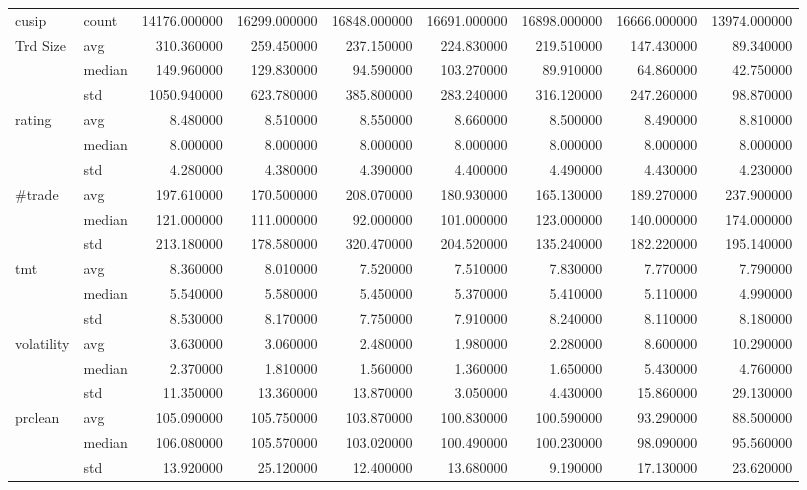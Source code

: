 \documentclass{article}
\begin{document}
\begin{landscape}
\begin{table}[ht]
\begin{tabular}{llrrrrrrr}
\cline{1-9}
cusip & count & 14176.000000 & 16299.000000 & 16848.000000 & 16691.000000 & 16898.000000 & 16666.000000 & 13974.000000 \\
\cline{1-9}
\multirow[t]{3}{*}{Trd Size} & avg & 310.360000 & 259.450000 & 237.150000 & 224.830000 & 219.510000 & 147.430000 & 89.340000 \\
 & median & 149.960000 & 129.830000 & 94.590000 & 103.270000 & 89.910000 & 64.860000 & 42.750000 \\
 & std & 1050.940000 & 623.780000 & 385.800000 & 283.240000 & 316.120000 & 247.260000 & 98.870000 \\
\cline{1-9}
\multirow[t]{3}{*}{rating} & avg & 8.480000 & 8.510000 & 8.550000 & 8.660000 & 8.500000 & 8.490000 & 8.810000 \\
 & median & 8.000000 & 8.000000 & 8.000000 & 8.000000 & 8.000000 & 8.000000 & 8.000000 \\
 & std & 4.280000 & 4.380000 & 4.390000 & 4.400000 & 4.490000 & 4.430000 & 4.230000 \\
\cline{1-9}
\multirow[t]{3}{*}{#trade} & avg & 197.610000 & 170.500000 & 208.070000 & 180.930000 & 165.130000 & 189.270000 & 237.900000 \\
 & median & 121.000000 & 111.000000 & 92.000000 & 101.000000 & 123.000000 & 140.000000 & 174.000000 \\
 & std & 213.180000 & 178.580000 & 320.470000 & 204.520000 & 135.240000 & 182.220000 & 195.140000 \\
\cline{1-9}
\multirow[t]{3}{*}{tmt} & avg & 8.360000 & 8.010000 & 7.520000 & 7.510000 & 7.830000 & 7.770000 & 7.790000 \\
 & median & 5.540000 & 5.580000 & 5.450000 & 5.370000 & 5.410000 & 5.110000 & 4.990000 \\
 & std & 8.530000 & 8.170000 & 7.750000 & 7.910000 & 8.240000 & 8.110000 & 8.180000 \\
\cline{1-9}
\multirow[t]{3}{*}{volatility} & avg & 3.630000 & 3.060000 & 2.480000 & 1.980000 & 2.280000 & 8.600000 & 10.290000 \\
 & median & 2.370000 & 1.810000 & 1.560000 & 1.360000 & 1.650000 & 5.430000 & 4.760000 \\
 & std & 11.350000 & 13.360000 & 13.870000 & 3.050000 & 4.430000 & 15.860000 & 29.130000 \\
\cline{1-9}
\multirow[t]{3}{*}{prclean} & avg & 105.090000 & 105.750000 & 103.870000 & 100.830000 & 100.590000 & 93.290000 & 88.500000 \\
 & median & 106.080000 & 105.570000 & 103.020000 & 100.490000 & 100.230000 & 98.090000 & 95.560000 \\
 & std & 13.920000 & 25.120000 & 12.400000 & 13.680000 & 9.190000 & 17.130000 & 23.620000 \\
\cline{1-9}
\bottomrule
\end{tabular}


\end{table}

\end{landscape}
\end{document}
